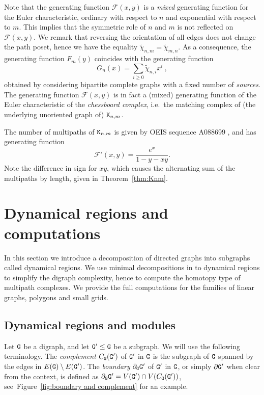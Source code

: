 \documentclass{amsart}
\begin{document}
Note that the generating function $\mathcal{F}(x,y)$ is a \emph{mixed} generating function for the Euler characteristic, ordinary with respect to $n$ and exponential with respect to $m$. This implies  that the symmetric role of $n$ and $m$ is not reflected on~$\mathcal{F}(x,y)$.
 We remark that reversing the orientation of all edges does not change the path poset, hence we have the equality $\widetilde{\chi}_{n,m}=\widetilde{\chi}_{m,n}$. As a consequence, the generating function $F_m(y)$ coincides with the generating function
\[ G_{n}(x) = \sum_{i \geq 0} \widetilde{\chi}_{n,i} x^{i} \ ,\]
obtained by considering bipartite complete graphs with a fixed number of \emph{sources}.
The generating function $\mathcal{F}(x,y)$ is in fact a (mixed) generating function of the Euler characteristic of the \emph{chessboard complex}, i.e.~the matching complex of (the  underlying unoriented graph of) ${\tt K}_{n,m}$. 


\begin{rem}
The number of multipaths of ${\tt K}_{n,m}$ is given by OEIS sequence A088699 \cite{OEIS}, and has generating function $$\mathcal{F}'(x,y)= \frac{e^x}{1-y-xy}.$$
Note the difference in sign for $xy$, which causes the alternating sum of the multipaths by length, given in Theorem~\ref{thm:Knm}.
\end{rem}

 
 
 
 
 \section{Dynamical regions and computations }\label{sec:modules}
 
 In this section we introduce a decomposition of directed graphs into subgraphs called dynamical regions. We use minimal decompositions in to dynamical regions to simplify the digraph complexity, hence to compute the homotopy type of multipath complexes. We provide the full computations for the families of linear graphs, polygons and small grids.


  

  \subsection{Dynamical regions and modules}
 Let ${\tt G}$ be a digraph, and let ${\tt G}'\leq {\tt G}$ be a subgraph. We will use the following terminology. The \emph{complement} $C_{{\tt G}}({\tt G}')$ of  ${\tt G}'$ in ${\tt G}$ is the subgraph of ${\tt G}$ spanned by the edges in $E({\tt G})\setminus E({\tt G}')$. The \emph{boundary} $\partial_{{\tt G}} {\tt G}'$ of ${\tt G}'$ in ${\tt G}$, or simply $\partial {\tt G}'$ when clear from the context, is defined as $\partial_{{\tt G}} {\tt G}'=V({\tt G}')\cap V(C_{{\tt G}}({\tt G}'))$, see~Figure~\ref{fig:boundary and complement} for an example. 
\end{document}
